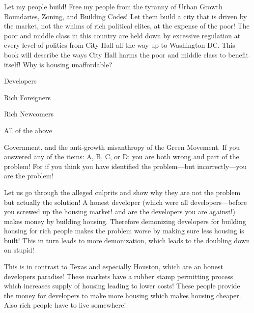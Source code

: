 \startchapter[title={Let My People Build!}]
\startsection[title={Let My People Build!}]
Let my people build!
Free my people from the tyranny of Urban Growth Boundaries, Zoning, and Building Codes!
Let them build a city that is driven by the market, not the whims of rich political elites, at the expense of the poor!
The poor and middle class in this country are held down by excessive regulation at every level of politics from  City Hall all the way up to Washington DC.
This book will describe the ways City Hall harms the poor and middle class to benefit itself!
\stopsection
\startsection[title={Why is housing unaffordable?}]
Why is housing unaffordable?
\startitemize[A]
\item Developers
\item Rich Foreigners
\item Rich Newcomers
\item All of the above
\item Government, and the anti-growth misanthropy of the Green Movement.
\stopitemize
If you answered any of the items: A, B, C, or D; you are both wrong and part of the problem!
For if you think you have identified the problem---but incorrectly---you are the problem!

Let us go through the alleged culprits and show why they are not the problem but actually the solution!
\startsubsection[title={Developers}]
A honest developer (which were all developers---before you screwed up the housing market! and are the developers you are against!) makes money by building housing.
Therefore demonizing developers for building housing for rich people makes the problem worse by making sure less housing is built! This in turn leads to more demonization, which leads to the doubling down on stupid!

This is in contrast to Texas and especially Houston, which are an honest developers paradise!
These markets have a rubber stamp permitting process which increases supply of housing leading to lower costs!
\stopsubsection
\startsubsection[title={Rich Foreigners and Newcomers}]
These people provide the money for developers to make more housing which makes housing cheaper.
Also rich people have to live somewhere!
\stopsubsection
\startsubsection[title={Filtering and Affordable Housing}]
\stopsubsection
\stopsection
\stopchapter
